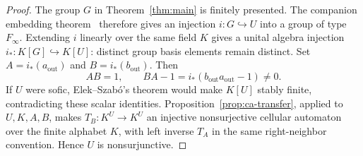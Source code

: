 \begin{proof}
The group $G$ in Theorem~\ref{thm:main} is finitely presented.
The companion embedding theorem~\cite[Theorem~1.1]{UniversalFinftyCompanion}
therefore gives an injection $i:G\hookrightarrow U$ into a group of
type $F_\infty$. Extending $i$ linearly over the same field $K$ gives a
unital algebra injection $i_*:K[G]\hookrightarrow K[U]$: distinct group
basis elements remain distinct. Set $A=i_*(a_{\mathrm{out}})$ and
$B=i_*(b_{\mathrm{out}})$. Then
\[
 AB=1,\qquad
 BA-1=i_*(b_{\mathrm{out}}a_{\mathrm{out}}-1)\ne0.
\]
If $U$ were sofic, Elek--Szab\'o's theorem
\cite[Corollary~4.7]{ElekSzabo2004} would make $K[U]$ stably finite,
contradicting these scalar identities. Proposition~\ref{prop:ca-transfer},
applied to $U,K,A,B$, makes $T_B:K^U\to K^U$ an injective nonsurjective
cellular automaton over the finite alphabet $K$, with left inverse
$T_A$ in the same right-neighbor convention. Hence $U$ is nonsurjunctive.
\end{proof}
